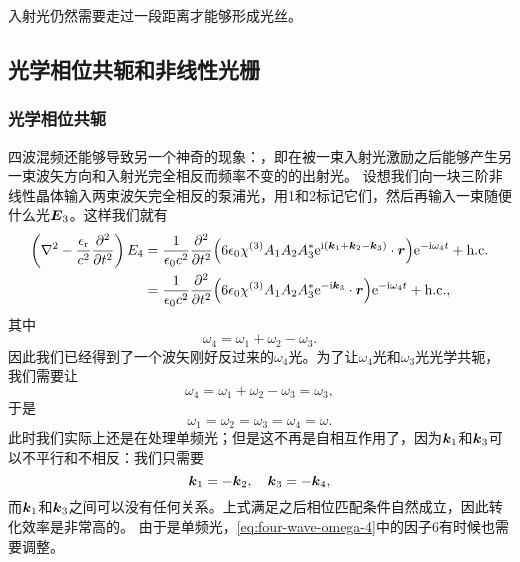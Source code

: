 入射光仍然需要走过一段距离才能够形成光丝。

\subsection{光学相位共轭和非线性光栅}

\subsubsection{光学相位共轭}

四波混频还能够导致另一个神奇的现象：，即在被一束入射光激励之后能够产生另一束波矢方向和入射光完全相反而频率不变的的出射光。
设想我们向一块三阶非线性晶体输入两束波矢完全相反的泵浦光，用1和2标记它们，然后再输入一束随便什么光$\vb*{E}_3$。这样我们就有
\begin{equation}
    \begin{aligned}
        \left( \laplacian - \frac{\epsilon_\text{r}}{c^2} \pdv[2]{t} \right) E_4 &= \frac{1}{\epsilon_0 c^2} \pdv[2]{t} (6 \epsilon_0 \chi^{(3)} A_1 A_2 A_3^* \ee^{\ii (\vb*{k}_1 + \vb*{k}_2 - \vb*{k}_3)} \cdot \vb*{r}) \ee^{- \ii \omega_4 t} + \text{h.c.} \\
        &= \frac{1}{\epsilon_0 c^2} \pdv[2]{t} (6 \epsilon_0 \chi^{(3)} A_1 A_2 A_3^* \ee^{- \ii \vb*{k}_3} \cdot \vb*{r}) \ee^{- \ii \omega_4 t} + \text{h.c.} ,
    \end{aligned}
    \label{eq:four-wave-omega-4}
\end{equation}
其中
\begin{equation}
    \omega_4 = \omega_1 + \omega_2 - \omega_3.
\end{equation}
因此我们已经得到了一个波矢刚好反过来的$\omega_4$光。为了让$\omega_4$光和$\omega_3$光光学共轭，我们需要让
\[
    \omega_4 = \omega_1 + \omega_2 - \omega_3 = \omega_3,
\]
于是
\begin{equation}
    \omega_1 = \omega_2 = \omega_3 = \omega_4 = \omega.
\end{equation}
此时我们实际上还是在处理单频光；但是这不再是自相互作用了，因为$\vb*{k}_1$和$\vb*{k}_3$可以不平行和不相反：我们只需要
\begin{equation}
    \vb*{k}_1 = - \vb*{k}_2, \quad \vb*{k}_3 = - \vb*{k}_4,
\end{equation}
而$\vb*{k}_1$和$\vb*{k}_3$之间可以没有任何关系。上式满足之后相位匹配条件自然成立，因此转化效率是非常高的。%
由于是单频光，\eqref{eq:four-wave-omega-4}中的因子$6$有时候也需要调整。


